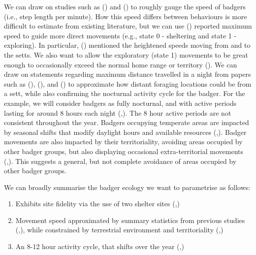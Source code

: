 \documentclass[10pt,a4paper]{article}
\begin{document}
We can draw on studies such as () and () to roughly gauge the speed of badgers (i.e., step length per minute).
How this speed differs between behaviours is more difficult to estimate from existing literature, but we can use () reported maximum speed to guide more direct movements (e.g., state 0 - sheltering and state 1 - exploring).
In particular, () mentioned the heightened speeds moving from and to the setts.
We also want to allow the exploratory (state 1) movements to be great enough to occasionally exceed the normal home range or territory ().
We can draw on statements regarding maximum distance travelled in a night from papers such as (), (), and () to approximate how distant foraging locations could be from a sett, while also confirming the nocturnal activity cycle for the badger.
For the example, we will consider badgers as fully nocturnal, and with active periods lasting for around 8 hours each night (,).
The 8 hour active periods are not consistent throughout the year.
Badgers occupying temperate areas are impacted by seasonal shifts that modify daylight hours and available resources (,).
Badger movements are also impacted by their territoriality, avoiding areas occupied by other badger groups, but also displaying occasional extra-territorial movements (,).
This suggests a general, but not complete avoidance of areas occupied by other badger groups.

We can broadly summarise the badger ecology we want to parametrise as follows:

\begin{enumerate}
\def\labelenumi{\arabic{enumi}.}
\item
  Exhibits site fidelity via the use of two shelter sites (,)
\item
  Movement speed approximated by summary statistics from previous studies (,), while constrained by terrestrial environment and territoriality (,)
\item
  An 8-12 hour activity cycle, that shifts over the year (,)
\end{enumerate}
\end{document}
